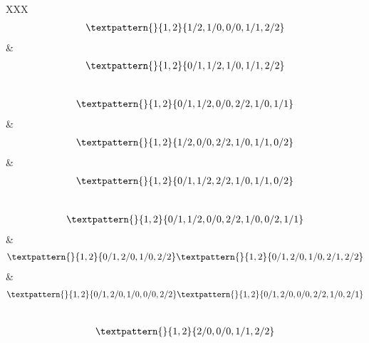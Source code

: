 \begin{center}
\begin{longtabu}[l]{XXX}
\begin{equation}
	\begin{gathered}
		\textpattern{}{1,2}{1/2,1/0,0/0,1/1,2/2}
	\end{gathered}
	\label{cls:108}
\end{equation}
&
\begin{equation}
	\begin{gathered}
		\textpattern{}{1,2}{0/1,1/2,1/0,1/1,2/2}
	\end{gathered}
	\label{cls:109}
\end{equation}
\\
\begin{equation}
	\begin{gathered}
		\textpattern{}{1,2}{0/1,1/2,0/0,2/2,1/0,1/1}
	\end{gathered}
	\label{cls:110}
\end{equation}
&
\begin{equation}
	\begin{gathered}
		\textpattern{}{1,2}{1/2,0/0,2/2,1/0,1/1,0/2}
	\end{gathered}
	\label{cls:111}
\end{equation}
&
\begin{equation}
	\begin{gathered}
		\textpattern{}{1,2}{0/1,1/2,2/2,1/0,1/1,0/2}
	\end{gathered}
	\label{cls:112}
\end{equation}
\\
\begin{equation}
	\begin{gathered}
		\textpattern{}{1,2}{0/1,1/2,0/0,2/2,1/0,0/2,1/1}
	\end{gathered}
	\label{cls:113}
\end{equation}
    &
\begin{equation}
	\begin{gathered}
		\textpattern{}{1,2}{0/1,2/0,1/0,2/2}
		\textpattern{}{1,2}{0/1,2/0,1/0,2/1,2/2}
	\end{gathered}
	\label{cls:114}
\end{equation}
    &
\begin{equation}
	\begin{gathered}
		\textpattern{}{1,2}{0/1,2/0,1/0,0/0,2/2}
		\textpattern{}{1,2}{0/1,2/0,0/0,2/2,1/0,2/1}
	\end{gathered}
	\label{cls:115}
\end{equation}
\\
\begin{equation}
	\begin{gathered}
		\textpattern{}{1,2}{2/0,0/0,1/1,2/2}

\end{gathered}
\end{equation}
\end{longtabu}
\end{center}
